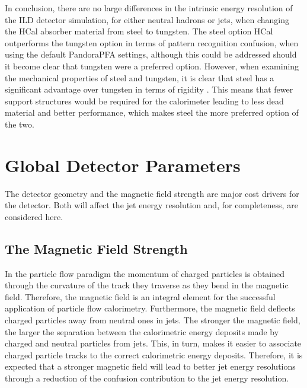 In conclusion, there are no large differences in the intrinsic energy resolution of the ILD detector simulation, for either neutral hadrons or jets, when changing the HCal absorber material from steel to tungsten.  The steel option HCal outperforms the tungsten option in terms of pattern recognition confusion, when using the default PandoraPFA settings, although this could be addressed should it become clear that tungsten were a preferred option.  However, when examining the mechanical properties of steel and tungsten, it is clear that steel has a significant advantage over tungsten in terms of rigidity \cite{Linssen:2012hp}.  This means that fewer support structures would be required for the calorimeter leading to less dead material and better performance, which makes steel the more preferred option of the two.


\section{Global Detector Parameters}
The detector geometry and the magnetic field strength are major cost drivers for the detector.  Both will affect the jet energy resolution and, for completeness, are considered here.  


\subsection{The Magnetic Field Strength}
\label{sec:bfield}
In the particle flow paradigm the momentum of charged particles is obtained through the curvature of the track they traverse as they bend in the magnetic field.  Therefore, the magnetic field is an integral element for the successful application of particle flow calorimetry.  Furthermore, the magnetic field deflects charged particles away from neutral ones in jets.  The stronger the magnetic field, the larger the separation between the calorimetric energy deposits made by charged and neutral particles from jets.  This, in turn, makes it easier to associate charged particle tracks to the correct calorimetric energy deposits.  Therefore, it is expected that a stronger magnetic field will lead to better jet energy resolutions through a reduction of the confusion contribution to the jet energy resolution.  


